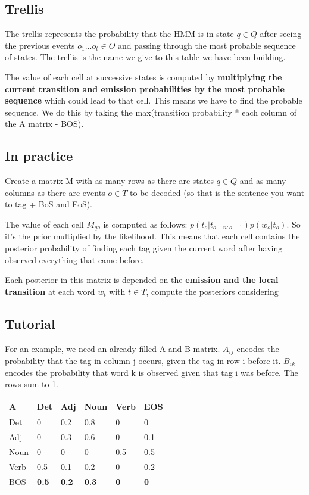 \documentclass[
  11pt,
  british,
]{article}
\begin{document}
\hypertarget{trellis}{%
\subsection{Trellis}\label{trellis}}

The trellis represents the probability that the HMM is in state
\(q \in Q\) after seeing the previous events \(o_{1}...o_{t}\in O\) and
passing through the most probable sequence of states. The trellis is the
name we give to this table we have been building.

The value of each cell at successive states is computed by
\textbf{multiplying the current transition and emission probabilities by
the most probable sequence} which could lead to that cell. This means we
have to find the probable sequence. We do this by taking the
max(transition probability * each column of the A matrix - BOS).

\hypertarget{in-practice}{%
\subsection{In practice}\label{in-practice}}

Create a matrix M with as many rows as there are states \(q \in Q\) and
as many columns as there are events \(o \in T\) to be decoded (so that
is the \href{../Data/Sentences.md}{sentence} you want to tag + BoS and
EoS).

The value of each cell \(M_{qo}\) is computed as follows:
\(p(t_{o}|t_{o-n:o-1})p(w_{o}|t_{o})\). So it's the prior multiplied by
the likelihood. This means that each cell contains the posterior
probability of finding each tag given the current word after having
observed everything that came before.

Each posterior in this matrix is depended on the \textbf{emission and
the local transition} at each word \(w_t\) with \(t \in T\), compute the
posteriors considering

\hypertarget{tutorial}{%
\subsection{Tutorial}\label{tutorial}}

For an example, we need an already filled A and B matrix. \(A_{ij}\)
encodes the probability that the tag in column j occurs, given the tag
in row i before it. \(B_{ik}\) encodes the probability that word k is
observed given that tag i was before. The rows sum to 1.

\begin{longtable}[]{@{}llllll@{}}
\toprule
A & Det & Adj & Noun & Verb & EOS \\
\midrule
\endhead
Det & 0 & 0.2 & 0.8 & 0 & 0 \\
Adj & 0 & 0.3 & 0.6 & 0 & 0.1 \\
Noun & 0 & 0 & 0 & 0.5 & 0.5 \\
Verb & 0.5 & 0.1 & 0.2 & 0 & 0.2 \\
BOS & \textbf{0.5} & \textbf{0.2} & \textbf{0.3} & \textbf{0} &
\textbf{0} \\
\bottomrule
\end{longtable}
\end{document}
